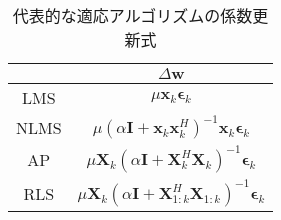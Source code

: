 \begin{table}[H]
    \centering
    \caption{代表的な適応アルゴリズムの係数更新式}
    \label{tab:formula}
    \begin{tabular}{|c|c|}
    \hline
         & \(\Delta \bm{w}\)                                                                                             \\ \hline
    LMS  & \( \mu \bm{x}_k \bm{\epsilon}_k \)                                                                         \\ \hline
    NLMS & \( \mu \left( \alpha \bm{I} + \bm{x}_k \bm{x}_k^H \right)^{-1} \bm{x}_k \bm{\epsilon}_k \)        \\ \hline
    AP   & \(\mu \bm{X}_k \left( \alpha \bm{I} + \bm{X}_k^H \bm{X}_k \right)^{-1} \bm{\epsilon}_k\)          \\ \hline
    RLS  & \( \mu \bm{X}_k \left( \alpha \bm{I} + \bm{X}_{1:k}^H \bm{X}_{1:k} \right)^{-1} \bm{\epsilon}_k\) \\ \hline
    \end{tabular}
\end{table}